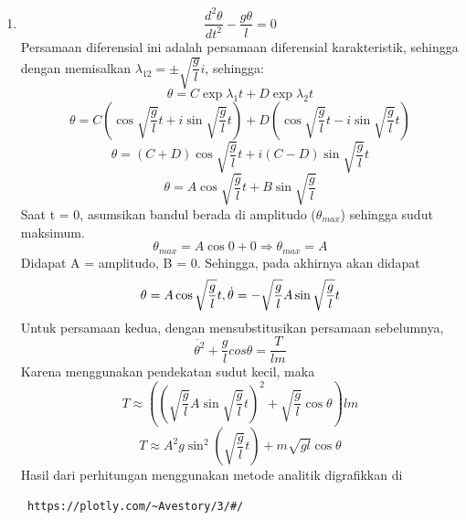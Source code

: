\documentclass[12pt]{article}
\begin{document}
\begin{enumerate}[label=(\alph*)]
			\item
			\begin{equation}
			\dfrac{d^2\theta}{dt^2} - \dfrac{g\theta}{l} =0 
			\end{equation} 
			Persamaan diferensial ini adalah persamaan diferensial karakteristik, sehingga  dengan memisalkan $\lambda_{12} = \pm \sqrt{\dfrac{g}{l}}i$, sehingga:
			\begin{equation}
			\theta = C\exp{\lambda_1t}+D\exp{\lambda_2t}
			\end{equation} 
			\begin{equation}
			\theta = C (\cos \sqrt{\dfrac{g}{l}}t + i \sin \sqrt{\dfrac{g}{l}}t) +D(\cos \sqrt{\dfrac{g}{l}}t - i \sin \sqrt{\dfrac{g}{l}}t)
			\end{equation} 
			\begin{equation}
			\theta = (C+D) \cos \sqrt{\dfrac{g}{l}}t +  i (C-D) \sin \sqrt{\dfrac{g}{l}}t
			\end{equation} 		
			\begin{equation}
			\theta = A \cos \sqrt{\dfrac{g}{l}}t +   B \sin \sqrt{\dfrac{g}{l}}
			\end{equation} 	
			Saat t = 0, asumsikan bandul berada di amplitudo ($\theta_{max}$) sehingga sudut maksimum.
			\begin{equation}
			\theta_{max} = A \cos 0 + 0 \Rightarrow \theta_{max} = A
			\end{equation} 	
			Didapat A = amplitudo, B  = 0.
			Sehingga, pada akhirnya akan didapat 
			\begin{equation}
			\theta = A \cos  \sqrt{\dfrac{g}{l}}t, \\ \dot{\theta} =-\sqrt{\dfrac{g}{l}} A \sin \sqrt{\dfrac{g}{l}}t
			\end{equation} 	
			Untuk persamaan kedua, dengan mensubstitusikan persamaan sebelumnya,
			\begin{equation}
			\dot{\theta^2} + \dfrac{g}{l}cos\theta = \dfrac{T}{lm}
			\end{equation} 
			Karena menggunakan pendekatan sudut kecil, maka	
			\begin{equation}
			T \approx \left((\sqrt{\dfrac{g}{l}}A\sin \sqrt{\dfrac{g}{l}}t)^2 +\sqrt{\dfrac{g}{l}}\cos\theta\right)lm
			\end{equation} 	
			\begin{equation}
			T \approx A^2 g \sin^2 (\sqrt{\dfrac{g}{l}}t) +m\sqrt{gl}  \cos \theta
			\end{equation} 
			Hasil dari perhitungan menggunakan metode analitik digrafikkan di 			
			\begin{verbatim} https://plotly.com/~Avestory/3/#/
			\end{verbatim}
				

\end{enumerate}
\end{document}
